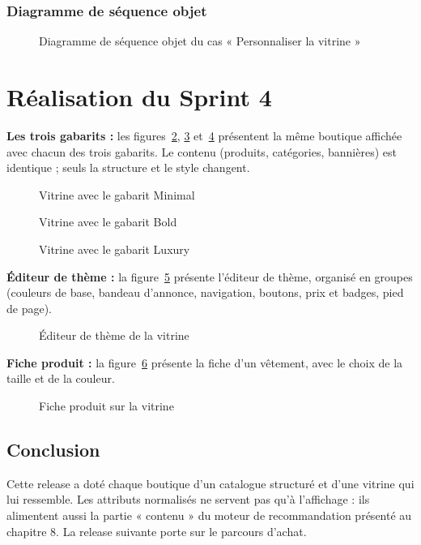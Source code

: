\subsubsection{Diagramme de séquence objet}
\begin{figure}[H]
    \centering
    \caption{Diagramme de séquence objet du cas « Personnaliser la vitrine »}
    \label{fig:dso-theme}
\end{figure}

\section{Réalisation du Sprint 4}
\textbf{Les trois gabarits :} les figures~\ref{fig:ui-minimal}, \ref{fig:ui-bold} et~\ref{fig:ui-luxury} présentent la même boutique affichée avec chacun des trois gabarits. Le contenu (produits, catégories, bannières) est identique ; seuls la structure et le style changent.
\begin{figure}[H]
    \centering
    \caption{Vitrine avec le gabarit Minimal}
    \label{fig:ui-minimal}
\end{figure}
\begin{figure}[H]
    \centering
    \caption{Vitrine avec le gabarit Bold}
    \label{fig:ui-bold}
\end{figure}
\begin{figure}[H]
    \centering
    \caption{Vitrine avec le gabarit Luxury}
    \label{fig:ui-luxury}
\end{figure}

\textbf{Éditeur de thème :} la figure~\ref{fig:ui-theme} présente l'éditeur de thème, organisé en groupes (couleurs de base, bandeau d'annonce, navigation, boutons, prix et badges, pied de page).
\begin{figure}[H]
    \centering
    \caption{Éditeur de thème de la vitrine}
    \label{fig:ui-theme}
\end{figure}

\textbf{Fiche produit :} la figure~\ref{fig:ui-fiche} présente la fiche d'un vêtement, avec le choix de la taille et de la couleur.
\begin{figure}[H]
    \centering
    \caption{Fiche produit sur la vitrine}
    \label{fig:ui-fiche}
\end{figure}

\subsection*{Conclusion}
Cette release a doté chaque boutique d'un catalogue structuré et d'une vitrine qui lui ressemble. Les attributs normalisés ne servent pas qu'à l'affichage : ils alimentent aussi la partie « contenu » du moteur de recommandation présenté au chapitre 8. La release suivante porte sur le parcours d'achat.
